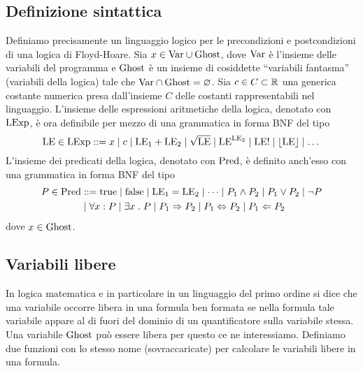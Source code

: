 \subsection{Definizione sintattica}

Definiamo precisamente un linguaggio logico per le
precondizioni e postcondizioni di una logica di Floyd-Hoare.
Sia $x \in \mathrm{Var} \cup \mathrm{Ghost}$, dove $\mathrm{Var}$ è l'insieme delle variabili del
programma e $\mathrm{Ghost}$ è un insieme di cosiddette ``variabili fantasma''
(variabili della logica) tale che $\mathrm{Var} \cap \mathrm{Ghost} = \varnothing$.
Sia $c \in C \subset \mathbb{R}$ una generica costante numerica presa dall'insieme
$C$ delle costanti rappresentabili nel linguaggio.
L'insieme delle espressioni aritmetiche della logica, denotato con $\mathrm{LExp}$,
è ora definibile per mezzo di una grammatica in forma BNF del tipo
\[
  \mathrm{LE} \in \mathrm{LExp} ::= x
                \mathrel{\mid} c
                \mathrel{\mid} \mathrm{LE}_1 + \mathrm{LE}_2
                \mathrel{\mid} \sqrt{\mathrm{LE}}
                \mathrel{\mid} \mathrm{LE}^{\mathrm{LE}_2}
                \mathrel{\mid} \mathrm{LE}!
                \mathrel{\mid} \lfloor \mathrm{LE} \rfloor
                \mathrel{\mid} \dots
\]
L'insieme dei predicati della logica, denotato con $\mathrm{Pred}$, è definito anch'esso con una grammatica in forma BNF del tipo
\begin{align*}
P \in \Pred &::= \true
            \vbar \false
            \vbar\LE_1 = \LE_2
            \vbar \dots
            \vbar P_1 \land P_2
            \vbar P_1 \lor P_2
            \vbar \neg P \\
            &\vbar \forall x \itc P
            \vbar \exists x \st P
            \vbar P_1 \Rightarrow P_2
            \vbar P_1 \Leftrightarrow P_2 \vbar P_1 \Leftarrow P_2
\end{align*}
dove $x \in\mathrm{Ghost}$.

\subsection{Variabili libere}
In logica matematica e in particolare in un linguaggio del primo ordine si dice che una variabile occorre libera in una formula ben formata se nella formula tale variabile appare al di fuori del dominio di un quantificatore sulla variabile stessa. Una variabile $\mathrm{Ghost}$ può essere libera per questo ce ne interessiamo.
Definiamo due funzioni con lo stesso nome (sovraccaricate) per calcolare le variabili libere in una formula.

